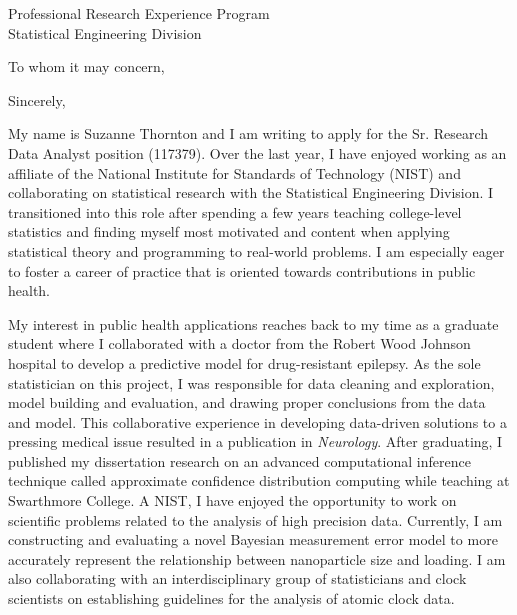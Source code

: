 \documentclass[11pt,a4paper,sans]{moderncv}
\begin{document}
	
	{Professional Research Experience Program\\
	Statistical Engineering Division}
	\date{\today }
	\opening{To whom it may concern,}
	\closing{Sincerely,}
	\makelettertitle
	
	
	My name is Suzanne Thornton and I am writing to apply for the Sr. Research Data Analyst position (117379). Over the last year, I have enjoyed working as an affiliate of the National Institute for Standards of Technology (NIST) and collaborating on statistical research with the Statistical Engineering Division. I transitioned into this role after spending a few years teaching college-level statistics and finding myself most motivated and content when applying statistical theory and programming to real-world problems. I am especially eager to foster a career of practice that is oriented towards contributions in public health. 
	
	My interest in public health applications reaches back to my time as a graduate student where I collaborated with a doctor from the Robert Wood Johnson hospital to develop a predictive model for drug-resistant epilepsy. As the sole statistician on this project, I was responsible for data cleaning and exploration, model building and evaluation, and drawing proper conclusions from the data and model. This collaborative experience in developing data-driven solutions to a pressing medical issue resulted in a publication in \emph{Neurology}. After graduating, I published my dissertation research on an advanced computational inference technique called approximate confidence distribution computing while teaching at Swarthmore College. A NIST, I have enjoyed the opportunity to work on scientific problems related to the analysis of high precision data. Currently, I am constructing and evaluating a novel Bayesian measurement error model to more accurately represent the relationship between nanoparticle size and loading. I am also collaborating with an interdisciplinary group of statisticians and clock scientists on establishing guidelines for the analysis of atomic clock data. 
		
\end{document}
